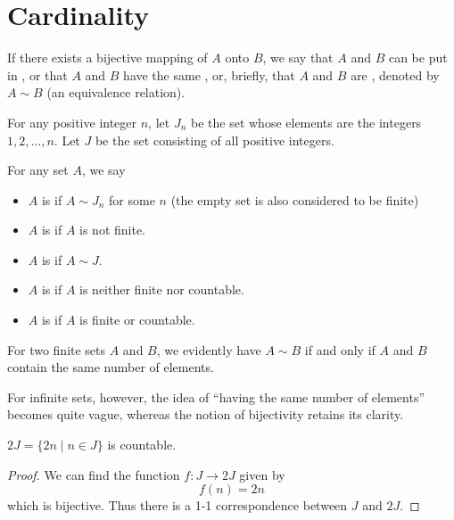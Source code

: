 \section{Cardinality}
\begin{definition}
If there exists a bijective mapping of $A$ onto $B$, we say that $A$ and $B$ can be put in , or that $A$ and $B$ have the same , or, briefly, that $A$ and $B$ are , denoted by $A\sim B$ (an equivalence relation). 
\end{definition}

\begin{notation}
For any positive integer $n$, let $J_n$ be the set whose elements are the integers $1,2,\dots,n$. Let $J$ be the set consisting of all positive integers. 
\end{notation}

\begin{definition}
For any set $A$, we say
\begin{itemize}
\item $A$ is  if $A\sim J_n$ for some $n$ (the empty set is also considered to be finite)
\item $A$ is  if $A$ is not finite.
\item $A$ is  if $A\sim J$.
\item $A$ is  if $A$ is neither finite nor countable.
\item $A$ is  if $A$ is finite or countable.
\end{itemize}
\end{definition}

For two finite sets $A$ and $B$, we evidently have $A\sim B$ if and only if $A$ and $B$ contain the same number of elements.

For infinite sets, however, the idea of ``having the same number of elements'' becomes quite vague, whereas the notion of bijectivity retains its clarity.

\begin{proposition}
$2J=\{2n\mid n\in J\}$ is countable.
\end{proposition}

\begin{proof}
We can find the function $f:J\to2J$ given by 
\[f(n)=2n\]
which is bijective. Thus there is a 1-1 correspondence between $J$ and $2J$.
\end{proof}

